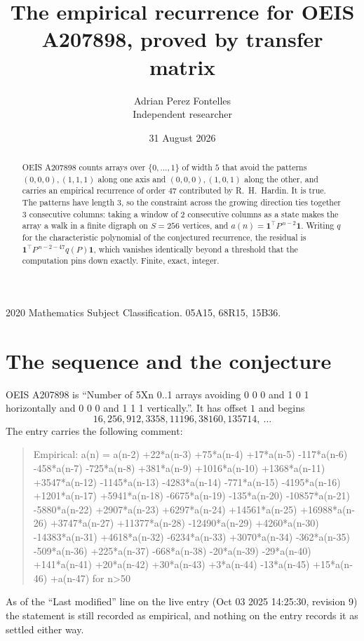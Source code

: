 \documentclass[11pt,a4paper]{article}
\title{The empirical recurrence for OEIS A207898, proved by transfer matrix}
\author{Adrian Perez Fontelles\\ \small Independent researcher}
\date{31 August 2026}
\theoremstyle{plain}
\theoremstyle{definition}
\begin{document}
\maketitle

\begin{abstract}
OEIS A207898 counts arrays over $\{0,\dots,1\}$ of width $5$ that avoid the patterns
$(0,0,0), (1,1,1)$ along one axis and $(0,0,0), (1,0,1)$ along the other, and carries an empirical recurrence of
order $47$ contributed by R.~H.~Hardin. It is true. The patterns have length $3$, so
the constraint across the growing direction ties together $3$ consecutive columns: taking a
window of $2$ consecutive columns as a state makes the array a walk in a finite digraph
on $S=256$ vertices, and $a(n)=\mathbf{1}^{\!\top}P^{\,n-2}\mathbf{1}$. Writing $q$
for the characteristic polynomial of the conjectured recurrence, the residual is
$\mathbf{1}^{\!\top}P^{\,n-2-47}q(P)\mathbf{1}$, which vanishes identically
beyond a threshold that the computation pins down exactly. Finite, exact, integer.
\end{abstract}

\noindent\small 2020 Mathematics Subject Classification. 05A15, 68R15, 15B36.\normalsize

\section{The sequence and the conjecture}

OEIS A207898 is ``Number of 5Xn 0..1 arrays avoiding 0 0 0 and 1 0 1 horizontally and 0 0 0 and 1 1 1 vertically.''. It has offset
$1$ and begins
\[
16, 256, 912, 3358, 11196, 38160, 135714,\ \dots
\]
The entry carries the following comment:
\begin{quote}\small
Empirical: a(n) = a(n-2) +22*a(n-3) +75*a(n-4) +17*a(n-5) -117*a(n-6) -458*a(n-7) -725*a(n-8) +381*a(n-9) +1016*a(n-10) +1368*a(n-11) +3547*a(n-12) -1145*a(n-13) -4283*a(n-14) -771*a(n-15) -4195*a(n-16) +1201*a(n-17) +5941*a(n-18) -6675*a(n-19) -135*a(n-20) -10857*a(n-21) -5880*a(n-22) +2907*a(n-23) +6297*a(n-24) +14561*a(n-25) +16988*a(n-26) +3747*a(n-27) +11377*a(n-28) -12490*a(n-29) +4260*a(n-30) -14383*a(n-31) +4618*a(n-32) -6234*a(n-33) +3070*a(n-34) -362*a(n-35) -509*a(n-36) +225*a(n-37) -668*a(n-38) -20*a(n-39) -29*a(n-40) +141*a(n-41) +20*a(n-42) +30*a(n-43) +3*a(n-44) -13*a(n-45) +15*a(n-46) +a(n-47) for n>50
\end{quote}
As of the ``Last modified'' line on the live entry (Oct 03 2025 14:25:30, revision
9) the statement is still recorded as empirical, and nothing on the entry
records it as settled either way.
\end{document}
